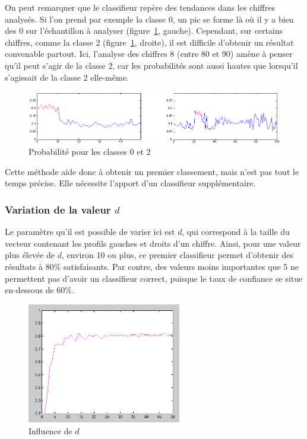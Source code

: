On peut remarquer que le classifieur repère des tendances dans les chiffres analysés. Si l'on prend par exemple la classe 0, un pic se forme là où il y a bien des 0 sur l'échantillon à analyser (figure~\ref{fig:proba102}, gauche). Cependant, sur certains chiffres, comme la classe 2 (figure~\ref{fig:proba102}, droite), il est difficile d'obtenir un résultat convenable partout. Ici, l'analyse des chiffres 8 (entre 80 et 90) amène à penser qu'il peut s'agir de la classe 2, car les probabilités sont aussi hautes que lorsqu'il s'agissait de la classe 2 elle-même.

\begin{figure}[hm]
	\begin{center}
		\includegraphics[width=\textwidth]{img/21-pbelonging1-more.png}
	\end{center}
	\caption{Probabilité pour les classes 0 et 2}
	\label{fig:proba102}
\end{figure}

Cette méthode aide donc à obtenir un premier classement, mais n'est pas tout le temps précise. Elle nécessite l'apport d'un classifieur supplémentaire.

\subsubsection{Variation de la valeur $d$}
Le paramètre qu'il est possible de varier ici est $d$, qui correspond à la taille du vecteur contenant les profils gauches et droits d'un chiffre. Ainsi, pour une valeur plus élevée de $d$, environ 10 ou plus, ce premier classifieur permet d'obtenir des résultats à 80\% satisfaisants. Par contre, des valeurs moins importantes que 5 ne permettent pas d'avoir un classifieur correct, puisque le taux de confiance se situe en-dessous de 60\%.

\begin{figure}[hm]
	\begin{center}
		\includegraphics[width=0.6\textwidth]{img/22-influence-d.png}
	\end{center}
	\caption{Influence de $d$}
	\label{fig:probad}
\end{figure}

